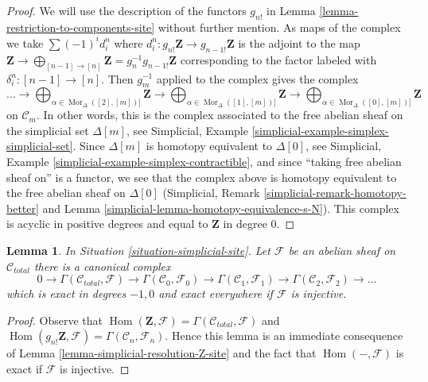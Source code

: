 \documentclass{stacks-project}
\theoremstyle{plain}
\newtheorem{lemma}[subsection]{Lemma}
\theoremstyle{definition}
\theoremstyle{remark}
\numberwithin{equation}{subsection}
\def\Hom{\mathop{\mathrm{Hom}}\nolimits}
\def\Mor{\mathop{\mathrm{Mor}}\nolimits}
\begin{document}
\begin{proof}
We will use the description of the functors $g_{n!}$ in
Lemma \ref{lemma-restriction-to-components-site} without further mention.
As maps of the complex we take $\sum (-1)^i d^n_i$ where
$d^n_i : g_{n!}\mathbf{Z} \to g_{n - 1!}\mathbf{Z}$ is the
adjoint to the map $\mathbf{Z} \to
\bigoplus_{[n - 1] \to [n]} \mathbf{Z} = g_n^{-1}g_{n - 1!}\mathbf{Z}$
corresponding to the factor labeled with $\delta^n_i : [n - 1] \to [n]$.
Then $g_m^{-1}$ applied to the complex gives the complex
$$
\ldots \to
\bigoplus\nolimits_{\alpha \in \Mor_\Delta([2], [m])]} \mathbf{Z} \to
\bigoplus\nolimits_{\alpha \in \Mor_\Delta([1], [m])]} \mathbf{Z} \to
\bigoplus\nolimits_{\alpha \in \Mor_\Delta([0], [m])]} \mathbf{Z}
$$
on $\mathcal{C}_m$.
In other words, this is the complex associated to the
free abelian sheaf on the simplicial set $\Delta[m]$, see
Simplicial, Example \ref{simplicial-example-simplex-simplicial-set}.
Since $\Delta[m]$ is homotopy equivalent to $\Delta[0]$, see
Simplicial, Example \ref{simplicial-example-simplex-contractible},
and since ``taking free abelian sheaf on'' is a functor,
we see that the complex above is homotopy equivalent to
the free abelian sheaf on $\Delta[0]$
(Simplicial, Remark \ref{simplicial-remark-homotopy-better} and
Lemma \ref{simplicial-lemma-homotopy-equivalence-s-N}).
This complex is acyclic in positive degrees
and equal to $\mathbf{Z}$ in degree $0$.
\end{proof}

\begin{lemma}
\label{lemma-cech-complex}
In Situation \ref{situation-simplicial-site}. Let $\mathcal{F}$ be an abelian
sheaf on $\mathcal{C}_{total}$ there is a canonical complex
$$
0 \to \Gamma(\mathcal{C}_{total}, \mathcal{F}) \to
\Gamma(\mathcal{C}_0, \mathcal{F}_0) \to
\Gamma(\mathcal{C}_1, \mathcal{F}_1) \to
\Gamma(\mathcal{C}_2, \mathcal{F}_2) \to \ldots
$$
which is exact in degrees $-1, 0$ and exact everywhere
if $\mathcal{F}$ is injective.
\end{lemma}

\begin{proof}
Observe that
$\Hom(\mathbf{Z}, \mathcal{F}) = \Gamma(\mathcal{C}_{total}, \mathcal{F})$
and
$\Hom(g_{n!}\mathbf{Z}, \mathcal{F}) = \Gamma(\mathcal{C}_n, \mathcal{F}_n)$.
Hence this lemma is an immediate consequence of
Lemma \ref{lemma-simplicial-resolution-Z-site}
and the fact that $\Hom(-, \mathcal{F})$ is exact if
$\mathcal{F}$ is injective.
\end{proof}
\end{document}
